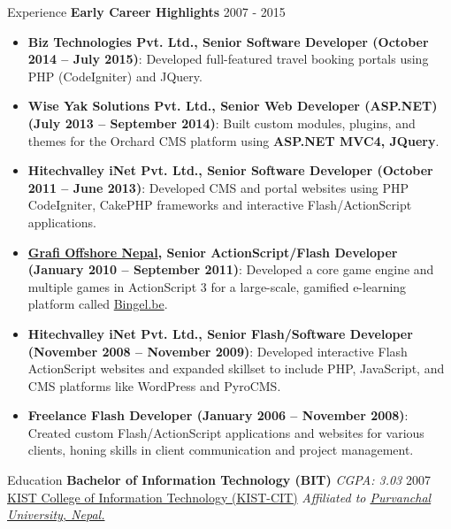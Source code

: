\documentclass{resume} %
\begin{document}
\begin{rSection}{Experience}
 \textbf{Early Career Highlights} \hfill 2007 - 2015 
 \begin{itemize}
    \itemsep -3pt {} 
     \item \textbf{Biz Technologies Pvt. Ltd., Senior Software Developer (October 2014 – July 2015)}: Developed full-featured travel booking portals using PHP (CodeIgniter) and JQuery.
     \item \textbf{Wise Yak Solutions Pvt. Ltd., Senior Web Developer (ASP.NET) (July 2013 – September 2014)}: Built custom modules, plugins, and themes for the Orchard CMS platform using \textbf{ASP.NET MVC4, JQuery}.
     \item \textbf{Hitechvalley iNet Pvt. Ltd., Senior Software Developer (October 2011 – June 2013)}: Developed CMS and portal websites using PHP CodeIgniter, CakePHP frameworks and interactive Flash/ActionScript applications.
     \item \textbf{\href{https://grafioffshorenepal.com/news/online-homework-platform-bingel-be/}{Grafi Offshore Nepal}, Senior ActionScript/Flash Developer (January 2010 – September 2011)}: Developed a core game engine and multiple games in ActionScript 3 for a large-scale, gamified e-learning platform called \href{https://www.vanin.be/lager-onderwijs/bingel/}{Bingel.be}.
     \item \textbf{Hitechvalley iNet Pvt. Ltd., Senior Flash/Software Developer (November 2008 – November 2009)}: Developed interactive Flash ActionScript websites and expanded skillset to include PHP, JavaScript, and CMS platforms like WordPress and PyroCMS.
     \item \textbf{Freelance Flash Developer (January 2006 – November 2008)}: Created custom Flash/ActionScript applications and websites for various clients, honing skills in client communication and project management.
 \end{itemize}
 
\end{rSection} 

\begin{rSection}{Education}
{\bf Bachelor of Information Technology (BIT)} \textit{CGPA: 3.03} \hfill {2007} \\
\href{https://kist.edu.np/program/bit}{KIST College of Information Technology (KIST-CIT)} \hfill {\textit{Affiliated to \href{https://www.purbanchaluniversity.edu.np/}{Purvanchal University, Nepal.}}} \\
\end{rSection}
\end{document}
